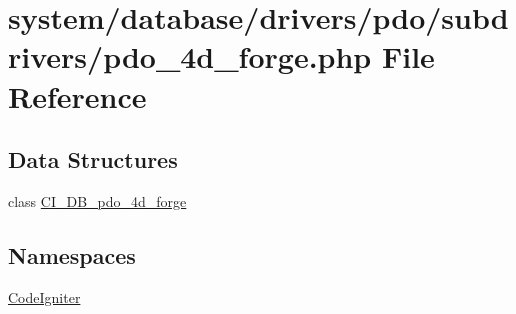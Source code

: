 \hypertarget{pdo__4d__forge_8php}{}\section{system/database/drivers/pdo/subdrivers/pdo\+\_\+4d\+\_\+forge.php File Reference}
\label{pdo__4d__forge_8php}
\subsection*{Data Structures}
\begin{DoxyCompactItemize}
\item 
class \mbox{\hyperlink{class_c_i___d_b__pdo__4d__forge}{C\+I\+\_\+\+D\+B\+\_\+pdo\+\_\+4d\+\_\+forge}}
\end{DoxyCompactItemize}
\subsection*{Namespaces}
\begin{DoxyCompactItemize}
\item 
 \mbox{\hyperlink{namespace_code_igniter}{Code\+Igniter}}
\end{DoxyCompactItemize}

